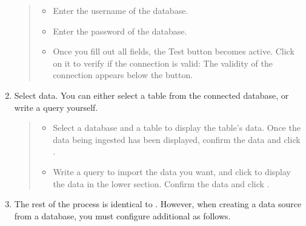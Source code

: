 \documentclass[letterpaper,10pt,english]{sphinxmanual}
\begin{document}
\begin{enumerate}
\begin{quote}
\begin{itemize}
\item {} 
 Enter the username of the database.

\item {} 
 Enter the password of the database.

\item {} 
 Once you fill out all fields, the Test button becomes active. Click on it to verify if the connection is valid: The validity of the connection appears below the button.

\end{itemize}
\end{quote}

\item {} 
Select data. You can either select a table from the connected database, or write a query yourself.
\begin{quote}

\begin{figure}[H]
\centering

\noindent{}
\end{figure}
\begin{itemize}
\item {} 
 Select a database and a table to display the table’s data. Once the data being ingested has been displayed, confirm the data and click .

\item {} 
 Write a query to import the data you want, and click  to display the data in the lower section. Confirm the data and click .

\end{itemize}
\end{quote}

\item {} 
The rest of the process is identical to {\hyperref[\detokenize{discovery/part02/create_a_data_source:create-datasource-from-file}]{}}. However, when creating a data source from a database, you must configure additional  as follows.
\begin{quote}

\begin{figure}[H]
\centering


\end{figure}
\end{quote}
\end{enumerate}
\end{document}
